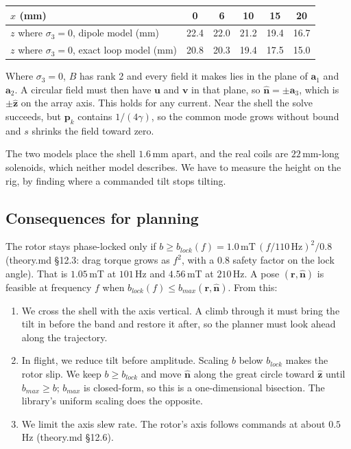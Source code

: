 \documentclass[11pt]{article}
\newcommand{\vb}[1]{\mathbf{#1}}
\newcommand{\uv}[1]{\hat{\mathbf{#1}}}
\begin{document}
\begin{table}[h]\centering
\begin{tabular}{lccccc}\toprule
$x$ (mm) & 0 & 6 & 10 & 15 & 20\\\midrule
$z$ where $\sigma_3=0$, dipole model (mm) & 22.4 & 22.0 & 21.2 & 19.4 & 16.7\\
$z$ where $\sigma_3=0$, exact loop model (mm) & 20.8 & 20.3 & 19.4 & 17.5 & 15.0\\\bottomrule
\end{tabular}
\end{table}

Where $\sigma_3 = 0$, $B$ has rank 2 and every field it makes lies in the plane of $\vb a_1$ and
$\vb a_2$. A circular field must then have $\vb u$ and $\vb v$ in that plane, so
$\uv n = \pm\vb a_3$, which is $\pm\uv z$ on the array axis. This holds for any current. Near the
shell the solve succeeds, but $\vb p_k$ contains $1/(4\gamma)$, so the common mode grows without
bound and $s$ shrinks the field toward zero.

The two models place the shell $1.6$\,mm apart, and the real coils are $22$\,mm-long solenoids,
which neither model describes. We have to measure the height on the rig, by finding where a
commanded tilt stops tilting.

\subsection{Consequences for planning}
The rotor stays phase-locked only if
$b\ge b_{lock}(f) = 1.0\,\text{mT}\,(f/110\,\text{Hz})^2/0.8$ (theory.md \S12.3: drag torque grows
as $f^2$, with a 0.8 safety factor on the lock angle). That is $1.05$\,mT at $101$\,Hz and
$4.56$\,mT at $210$\,Hz. A pose $(\vb r,\uv n)$ is feasible at frequency $f$ when
$b_{lock}(f)\le b_{max}(\vb r,\uv n)$. From this:
\begin{enumerate}[nosep]
  \item We cross the shell with the axis vertical. A climb through it must bring the tilt in
        before the band and restore it after, so the planner must look ahead along the
        trajectory.
  \item In flight, we reduce tilt before amplitude. Scaling $b$ below $b_{lock}$ makes the rotor
        slip. We keep $b\ge b_{lock}$ and move $\uv n$ along the great circle toward $\uv z$ until
        $b_{max}\ge b$; $b_{max}$ is closed-form, so this is a one-dimensional bisection. The
        library's uniform scaling does the opposite.
  \item We limit the axis slew rate. The rotor's axis follows commands at about $0.5$\,Hz
        (theory.md \S12.6).
\end{enumerate}
\end{document}
